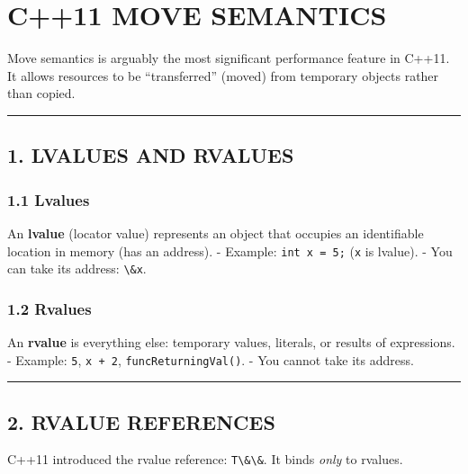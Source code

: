 \hypertarget{c11-move-semantics}{%
\chapter{C++11 MOVE SEMANTICS}\label{c11-move-semantics}}

Move semantics is arguably the most significant performance feature in
C++11. It allows resources to be ``transferred'' (moved) from temporary
objects rather than copied.

\begin{center}\rule{0.5\linewidth}{0.5pt}\end{center}

\hypertarget{lvalues-and-rvalues}{%
\section{1. LVALUES AND RVALUES}\label{lvalues-and-rvalues}}

\hypertarget{lvalues}{%
\subsection{1.1 Lvalues}\label{lvalues}}

An \textbf{lvalue} (locator value) represents an object that occupies an
identifiable location in memory (has an address). - Example:
\passthrough{\lstinline!int x = 5;!} (\passthrough{\lstinline!x!} is
lvalue). - You can take its address: \passthrough{\lstinline!\&x!}.

\hypertarget{rvalues}{%
\subsection{1.2 Rvalues}\label{rvalues}}

An \textbf{rvalue} is everything else: temporary values, literals, or
results of expressions. - Example: \passthrough{\lstinline!5!},
\passthrough{\lstinline!x + 2!},
\passthrough{\lstinline!funcReturningVal()!}. - You cannot take its
address.

\begin{center}\rule{0.5\linewidth}{0.5pt}\end{center}

\hypertarget{rvalue-references}{%
\section{2. RVALUE REFERENCES}\label{rvalue-references}}

C++11 introduced the rvalue reference: \passthrough{\lstinline!T\&\&!}.
It binds \emph{only} to rvalues.

